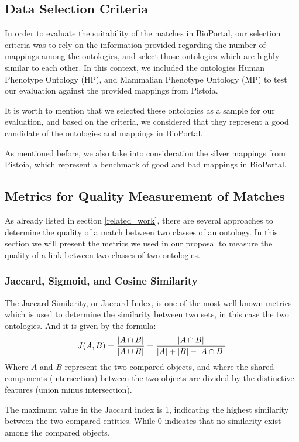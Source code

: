 \documentclass[runningheads]{llncs}
\begin{document}
\subsection{Data Selection Criteria}
In order to evaluate the suitability of the matches in BioPortal, our selection criteria was to rely on the information provided regarding the number of mappings among the ontologies, and select those ontologies which are highly similar to each other. In this context, we included the ontologies Human Phenotype Ontology (HP), and Mammalian Phenotype Ontology (MP) to test our evaluation against the provided mappings from Pistoia.

It is worth to mention that we selected these ontologies as a sample for our evaluation, and based on the criteria, we considered that they represent a good candidate of the ontologies and mappings in BioPortal.

As mentioned before, we also take into consideration the silver mappings from Pistoia, which represent a benchmark of good and bad mappings in BioPortal.

\subsection{Metrics for Quality Measurement of Matches}
As already listed in section \ref{related_work}, there are several approaches to determine the quality of a match between two classes of an ontology. In this section we will present the metrics we used in our proposal to measure the quality of a link between two classes of two ontologies. 

\subsubsection{Jaccard, Sigmoid, and Cosine Similarity} \label{jaccard}
The Jaccard Similarity, or Jaccard Index, is one of the most well-known metrics which is used to determine the similarity between two sets, in this case the two ontologies. And it is given by the formula:
\small
\begin{equation}
    J(A,B) = {{|A \cap B|}\over{|A \cup B|}} = {{|A \cap B|}\over{|A| + |B| - |A \cap B|}}
\end{equation}
\normalsize
Where $A$ and $B$ represent the two compared objects, and where the shared components (intersection) between the two objects are divided by the distinctive features (union minus intersection). 
 
The maximum value in the Jaccard index is 1, indicating the highest similarity between the two compared entities. While 0 indicates that no similarity exist among the compared objects.
\end{document}
